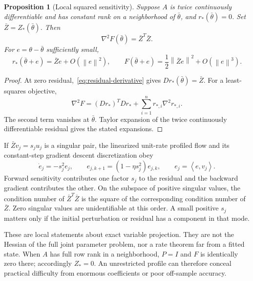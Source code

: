 \documentclass[11pt]{article}
\newtheorem{proposition}{Proposition}[section]
\theoremstyle{remark}
\newcommand{\norm}[1]{\left\lVert #1\right\rVert}
\newcommand{\ip}[2]{\left\langle #1,#2\right\rangle}
\begin{document}
\begin{proposition}[Local squared sensitivity]
Suppose $A$ is twice continuously differentiable and has constant rank on a neighborhood of $\bar\theta$, and $r_*(\bar\theta)=0$. Set $\bar Z=Z_*(\bar\theta)$. Then
\begin{equation}
 \nabla^2F(\bar\theta)=\bar Z^T\bar Z.
 \label{eq:hessian}
\end{equation}
For $e=\theta-\bar\theta$ sufficiently small,
\begin{equation}
 r_*(\bar\theta+e)=\bar Ze+O(\norm{e}^2),\qquad
 F(\bar\theta+e)=\frac12\norm{\bar Ze}^2+O(\norm{e}^3).
\end{equation}
\end{proposition}
\begin{proof}
At zero residual,~\eqref{eq:residual-derivative} gives $Dr_*(\bar\theta)=\bar Z$. For a least-squares objective,
\begin{equation}
 \nabla^2F=(Dr_*)^TDr_*+\sum_{i=1}^{n}r_{*,i}\nabla^2r_{*,i}.
\end{equation}
The second term vanishes at $\bar\theta$. Taylor expansion of the twice continuously differentiable residual gives the stated expansions.
\end{proof}

If $\bar Zv_j=s_ju_j$ is a singular pair, the linearized unit-rate profiled flow and its constant-step gradient descent discretization obey
\begin{equation}
 \dot e_j=-s_j^2e_j,\qquad
 e_{j,k+1}=(1-\eta s_j^2)e_{j,k},\qquad e_j=\ip{e}{v_j}.
 \label{eq:squared-rate}
\end{equation}
Forward sensitivity contributes one factor $s_j$ to the residual and the backward gradient contributes the other. On the subspace of positive singular values, the condition number of $\bar Z^T\bar Z$ is the square of the corresponding condition number of $\bar Z$. Zero singular values are unidentifiable at this order. A small positive $s_j$ matters only if the initial perturbation or residual has a component in that mode.

These are local statements about exact variable projection. They are not the Hessian of the full joint parameter problem, nor a rate theorem far from a fitted state. When $A$ has full row rank in a neighborhood, $P=I$ and $F$ is identically zero there; accordingly $Z_*=0$. An unrestricted profile can therefore conceal practical difficulty from enormous coefficients or poor off-sample accuracy.
\end{document}
